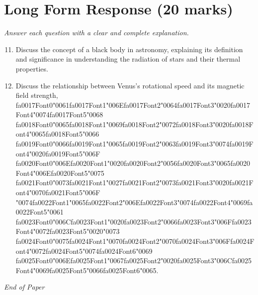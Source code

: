 \documentclass[12pt]{article}
\begin{document}
\begin{enumerate}[label=\arabic*.]
\end{enumerate}

\section*{Long Form Response (20 marks)}
\textit{Answer each question with a clear and complete explanation.}
\begin{enumerate}[label=\arabic*.]
\setcounter{enumi}{10}
\item Discuss the concept of a black body in astronomy, explaining its definition and
significance in understanding the radiation of stars and their thermal properties.
\item Discuss the relationship between Venus's rotational speed and its magnetic field strength,
{\csname fa0017Font0\endcsname\char"0061}{\csname fa0017Font1\endcsname\char"006E}{\csname fa0017Font2\endcsname\char"0064}{\csname fa0017Font3\endcsname\char"0020}{\csname fa0017Font4\endcsname\char"0074}{\csname fa0017Font5\endcsname\char"0068} {\csname fa0018Font0\endcsname\char"0065}{\csname fa0018Font1\endcsname\char"0069}{\csname fa0018Font2\endcsname\char"0072}{\csname fa0018Font3\endcsname\char"0020}{\csname fa0018Font4\endcsname\char"0065}{\csname fa0018Font5\endcsname\char"0066} {\csname fa0019Font0\endcsname\char"0066}{\csname fa0019Font1\endcsname\char"0065}{\csname fa0019Font2\endcsname\char"0063}{\csname fa0019Font3\endcsname\char"0074}{\csname fa0019Font4\endcsname\char"0020}{\csname fa0019Font5\endcsname\char"006F} {\csname fa0020Font0\endcsname\char"006E}{\csname fa0020Font1\endcsname\char"0020}{\csname fa0020Font2\endcsname\char"0056}{\csname fa0020Font3\endcsname\char"0065}{\csname fa0020Font4\endcsname\char"006E}{\csname fa0020Font5\endcsname\char"0075} {\csname fa0021Font0\endcsname\char"0073}{\csname fa0021Font1\endcsname\char"0027}{\csname fa0021Font2\endcsname\char"0073}{\csname fa0021Font3\endcsname\char"0020}{\csname fa0021Font4\endcsname\char"0070}{\csname fa0021Font5\endcsname\char"006F} {\char"0074}{\csname fa0022Font1\endcsname\char"0065}{\csname fa0022Font2\endcsname\char"006E}{\csname fa0022Font3\endcsname\char"0074}{\csname fa0022Font4\endcsname\char"0069}{\csname fa0022Font5\endcsname\char"0061} {\csname fa0023Font0\endcsname\char"006C}{\csname fa0023Font1\endcsname\char"0020}{\csname fa0023Font2\endcsname\char"0066}{\csname fa0023Font3\endcsname\char"006F}{\csname fa0023Font4\endcsname\char"0072}{\csname fa0023Font5\endcsname\char"0020}{\char"0073} {\csname fa0024Font0\endcsname\char"0075}{\csname fa0024Font1\endcsname\char"0070}{\csname fa0024Font2\endcsname\char"0070}{\csname fa0024Font3\endcsname\char"006F}{\csname fa0024Font4\endcsname\char"0072}{\csname fa0024Font5\endcsname\char"0074}{\csname fa0024Font6\endcsname\char"0069} {\csname fa0025Font0\endcsname\char"006E}{\csname fa0025Font1\endcsname\char"0067}{\csname fa0025Font2\endcsname\char"0020}{\csname fa0025Font3\endcsname\char"006C}{\csname fa0025Font4\endcsname\char"0069}{\csname fa0025Font5\endcsname\char"0066}{\csname fa0025Font6\endcsname\char"0065}.
\end{enumerate}

\vfill
\noindent\textit{End of Paper}
\end{document}
